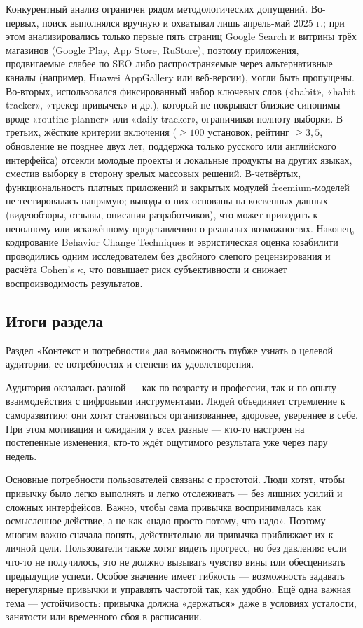 \documentclass[pdflatex,sn-mathphys-num]{sn-jnl}%
\theoremstyle{thmstyleone}%
\theoremstyle{thmstyletwo}%
\theoremstyle{thmstylethree}%
\begin{document}
Конкурентный анализ ограничен рядом методологических допущений. Во-первых, поиск выполнялся вручную и охватывал лишь апрель-май 2025 г.; при этом анализировались только первые пять страниц Google Search и витрины трёх магазинов (Google Play, App Store, RuStore), поэтому приложения, продвигаемые слабее по SEO либо распространяемые через альтернативные каналы (например, Huawei AppGallery или веб-версии), могли быть пропущены. Во-вторых, использовался фиксированный набор ключевых слов («habit», «habit tracker», «трекер привычек» и др.), который не покрывает близкие синонимы вроде «routine planner» или «daily tracker», ограничивая полноту выборки. В-третьих, жёсткие критерии включения ($\geq100$ установок, рейтинг $\geq3{,}5$, обновление не позднее двух лет, поддержка только русского или английского интерфейса) отсекли молодые проекты и локальные продукты на других языках, сместив выборку в сторону зрелых массовых решений. В-четвёртых, функциональность платных приложений и закрытых модулей freemium-моделей не тестировалась напрямую; выводы о них основаны на косвенных данных (видеообзоры, отзывы, описания разработчиков), что может приводить к неполному или искажённому представлению о реальных возможностях. Наконец, кодирование Behavior Change Techniques и эвристическая оценка юзабилити проводились одним исследователем без двойного слепого рецензирования и расчёта Cohen's $\kappa$, что повышает риск субъективности и снижает воспроизводимость результатов.

\subsection{Итоги раздела}\label{Requirements}

Раздел «Контекст и потребности» дал возможность глубже узнать о целевой аудитории, ее потребностях и степени их удовлетворения. 

Аудитория оказалась разной — как по возрасту и профессии, так и по опыту взаимодействия с цифровыми инструментами. Людей объединяет стремление к саморазвитию: они хотят становиться организованнее, здоровее, увереннее в себе. При этом мотивация и ожидания у всех разные — кто-то настроен на постепенные изменения, кто-то ждёт ощутимого результата уже через пару недель.

Основные потребности пользователей связаны с простотой. Люди хотят, чтобы привычку было легко выполнять и легко отслеживать — без лишних усилий и сложных интерфейсов. Важно, чтобы сама привычка воспринималась как осмысленное действие, а не как «надо просто потому, что надо». Поэтому многим важно сначала понять, действительно ли привычка приближает их к личной цели. Пользователи также хотят видеть прогресс, но без давления: если что-то не получилось, это не должно вызывать чувство вины или обесценивать предыдущие успехи. Особое значение имеет гибкость — возможность задавать нерегулярные привычки и управлять частотой так, как удобно. Ещё одна важная тема — устойчивость: привычка должна «держаться» даже в условиях усталости, занятости или временного сбоя в расписании.
\end{document}
